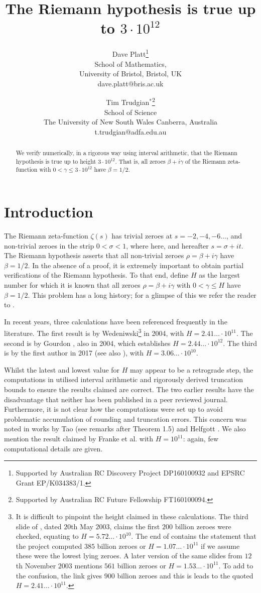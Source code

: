 \documentclass[12pt]{article}
\author{Dave Platt\footnote{Supported by Australian RC Discovery Project DP160100932 and  EPSRC Grant EP/K034383/1.}\\ School of Mathematics, \\ University of Bristol, Bristol, UK\\dave.platt@bris.ac.uk\and  Tim Trudgian$^{*}$\footnote{Supported by Australian RC Future Fellowship FT160100094.} \\
School of Science\\ The University of New South Wales Canberra, Australia \\
  t.trudgian@adfa.edu.au}
\title{The Riemann hypothesis is true up to $3\cdot 10^{12}$}
\begin{document}
\maketitle
\begin{abstract}
\noindent 
We verify numerically, in a rigorous way using interval arithmetic, that the Riemann hypothesis is true up to height $3\cdot10^{12}$. That is, all zeroes $\beta + i\gamma$ of the Riemann zeta-function with $0<\gamma\leq 3\cdot 10^{12}$ have $\beta = 1/2$.
\end{abstract}
\section{Introduction}
\noindent
The Riemann zeta-function $\zeta(s)$ has trivial zeroes at $s=-2,-4,-6\ldots$, and non-trivial zeroes in the strip $0< \sigma <1$, where here, and hereafter $s= \sigma + it$. The Riemann hypothesis asserts that all non-trivial zeroes  $\rho = \beta + i\gamma$ have $\beta = 1/2$. In the absence of a proof, it is extremely important to obtain partial verifications of the Riemann hypothesis. To that end, define $H$ as the largest number for which it is known that all zeroes $\rho = \beta + i\gamma$ with $0<\gamma \leq H$ have $\beta = 1/2$.
%
This problem has a long history; for a glimpse of this we refer the reader to \cite[p.\ 2]{Gourdon}.

In recent years, three calculations have been referenced frequently in the literature. The first result is by Wedeniwski\footnote{It is difficult to pinpoint the height claimed in these calculations. The third slide of \cite{Wedeniwski}, dated $20$th May $2003$, claims the first $200$ billion zeroes were checked, equating to $H=5.72\ldots\cdot 10^{10}$. The end of \cite{Wedeniwski} contains the statement that the project computed $385$ billion zeroes or $H=1.07\ldots\cdot 10^{11}$ if we assume these were the lowest lying zeroes. A later version of the same slides from $12$th November $2003$ mentions $561$ billion zeroes or $H=1.53\ldots\cdot 10^{11}$. To add to the confusion, the link \cite{Wiki}  gives $900$ billion zeroes and this is leads to the quoted $H=2.41\ldots\cdot 10^{11}$.} \cite{Wedeniwski} in 2004, with $H=2.41\ldots\cdot 10^{11}$. 
%
The second is by Gourdon \cite{Gourdon}, also in 2004, which establishes $H= 2.44\ldots \cdot 10^{12}$. The third is by the first author in 2017 \cite{Platt} (see also \cite{PlattThesis}), with $H= 3.06\ldots\cdot 10^{10}$.

Whilst the latest and lowest value for $H$ may appear to be a retrograde step, the computations in \cite{Platt} utilised interval arithmetic and rigorously derived truncation bounds to ensure the results claimed are correct. The two earlier results have the disadvantage that neither has been published in a peer reviewed journal. Furthermore, it is not clear how the computations were set up to avoid problematic accumulation of rounding and truncation errors. This concern was noted in works by Tao \cite{Tao} (see remarks after Theorem 1.5) and Helfgott \cite{Helfgott}. We also mention the result claimed by Franke et al. \cite{Frank} with $H= 10^{11}$: again, few computational details are given.
\end{document}
